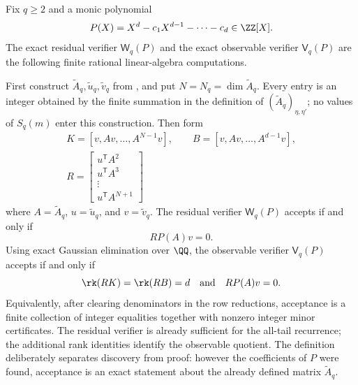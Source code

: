 \begin{definition}
\label{def:exact-kernel-verifier}
Fix \(q\ge2\) and a monic polynomial
\[
  P(X)=X^d-c_1X^{d-1}-\cdots-c_d\in\ZZ[X].
\]
The exact residual verifier \(\mathsf W_q(P)\) and the exact observable
verifier \(\mathsf V_q(P)\) are the following finite rational linear-algebra
computations.

First construct \(\widetilde A_q,\widetilde u_q,\widetilde v_q\) from
, and put \(N=N_q=\dim\widetilde A_q\).  Every
entry is an integer obtained by the finite summation in the definition of
\((\widetilde A_q)_{\eta,\eta'}\); no values of \(S_q(m)\) enter this
construction.  Then form
\[
  \begin{gathered}
  K=[v,Av,\dots,A^{N-1}v],
  \qquad
  B=[v,Av,\dots,A^{d-1}v],\\
  R=
  \begin{bmatrix}
  u^{\mathsf T}A^2\\
  u^{\mathsf T}A^3\\
  \vdots\\
  u^{\mathsf T}A^{N+1}
  \end{bmatrix}
  \end{gathered}
\]
where \(A=\widetilde A_q\), \(u=\widetilde u_q\), and
\(v=\widetilde v_q\).  The residual verifier \(\mathsf W_q(P)\) accepts if and
only if
\[
  RP(A)v=0.
\]
Using exact Gaussian elimination over \(\QQ\), the observable verifier
\(\mathsf V_q(P)\) accepts if and only if
\[
  \rk(RK)=\rk(RB)=d
  \quad\text{and}\quad
  RP(A)v=0.
\]
Equivalently, after clearing denominators in the row reductions, acceptance is
a finite collection of integer equalities together with nonzero integer minor
certificates.  The residual verifier is already sufficient for the all-tail
recurrence; the additional rank identities identify the observable quotient.
The definition deliberately separates discovery from proof: however the
coefficients of \(P\) were found, acceptance is an exact statement about the
already defined matrix \(\widetilde A_q\).
\end{definition}

